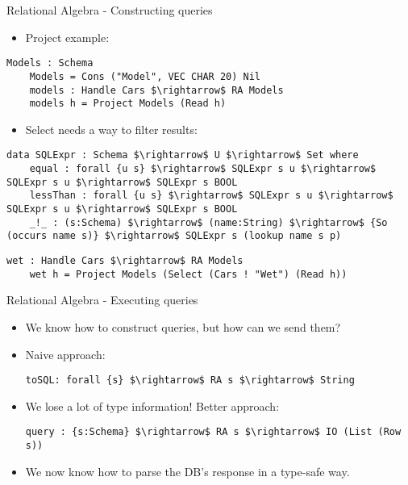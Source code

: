 \documentclass[10pt]{beamer}
\begin{document}
\begin{frame}[fragile]{Relational Algebra - Constructing queries}
\begin{itemize}
\item Project example:
\end{itemize}
\begin{lstlisting}[mathescape=true]
	Models : Schema
	Models = Cons ("Model", VEC CHAR 20) Nil
	models : Handle Cars $\rightarrow$ RA Models
	models h = Project Models (Read h)
\end{lstlisting}
\begin{itemize}
\item Select needs a way to filter results:
\end{itemize}
\begin{lstlisting}[mathescape=true]
	data SQLExpr : Schema $\rightarrow$ U $\rightarrow$ Set where
	equal : forall {u s} $\rightarrow$ SQLExpr s u $\rightarrow$ SQLExpr s u $\rightarrow$ SQLExpr s BOOL
	lessThan : forall {u s} $\rightarrow$ SQLExpr s u $\rightarrow$ SQLExpr s u $\rightarrow$ SQLExpr s BOOL
	_!_ : (s:Schema) $\rightarrow$ (name:String) $\rightarrow$ {So (occurs name s)} $\rightarrow$ SQLExpr s (lookup name s p)
\end{lstlisting}

\begin{lstlisting}[mathescape=true]
	wet : Handle Cars $\rightarrow$ RA Models
	wet h = Project Models (Select (Cars ! "Wet") (Read h))
\end{lstlisting}

\end{frame}

\begin{frame}[fragile]{Relational Algebra - Executing queries}

\begin{itemize}
\item We know how to construct queries, but how can we send them?
\item Naive approach:
\begin{lstlisting}[mathescape=true]
	toSQL: forall {s} $\rightarrow$ RA s $\rightarrow$ String
\end{lstlisting}
\item We lose a lot of type information! Better approach:
\begin{lstlisting}[mathescape=true]
	query : {s:Schema} $\rightarrow$ RA s $\rightarrow$ IO (List (Row s))
\end{lstlisting}
\item We now know how to parse the DB's response in a type-safe way.
\end{itemize}

\end{frame}
\end{document}
